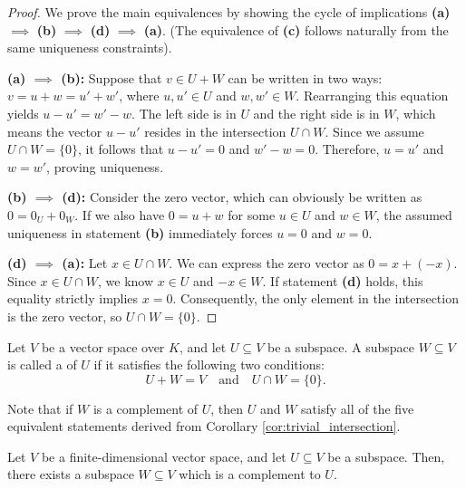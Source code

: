 \begin{proof}
We prove the main equivalences by showing the cycle of implications \textbf{(a)} $\implies$ \textbf{(b)} $\implies$ \textbf{(d)} $\implies$ \textbf{(a)}. (The equivalence of \textbf{(c)} follows naturally from the same uniqueness constraints).

\textbf{(a) $\implies$ (b):} Suppose that $v \in U + W$ can be written in two ways: $v = u + w = u' + w'$, where $u, u' \in U$ and $w, w' \in W$. Rearranging this equation yields $u - u' = w' - w$. The left side is in $U$ and the right side is in $W$, which means the vector $u - u'$ resides in the intersection $U \cap W$. Since we assume $U \cap W = \{0\}$, it follows that $u - u' = 0$ and $w' - w = 0$. Therefore, $u = u'$ and $w = w'$, proving uniqueness.

\textbf{(b) $\implies$ (d):} Consider the zero vector, which can obviously be written as $0 = 0_U + 0_W$. If we also have $0 = u + w$ for some $u \in U$ and $w \in W$, the assumed uniqueness in statement \textbf{(b)} immediately forces $u = 0$ and $w = 0$.

\textbf{(d) $\implies$ (a):} Let $x \in U \cap W$. We can express the zero vector as $0 = x + (-x)$. Since $x \in U \cap W$, we know $x \in U$ and $-x \in W$. If statement \textbf{(d)} holds, this equality strictly implies $x = 0$. Consequently, the only element in the intersection is the zero vector, so $U \cap W = \{0\}$.
\end{proof}

\setcounter{theorem}{3} %

\begin{definition}
\label{def:complement}
Let $V$ be a vector space over $K$, and let $U \subseteq V$ be a subspace. A subspace $W \subseteq V$ is called a  of $U$ if it satisfies the following two conditions:
\[
U + W = V \quad \text{and} \quad U \cap W = \{0\}.
\]
\end{definition}

\begin{remark}
Note that if $W$ is a complement of $U$, then $U$ and $W$ satisfy all of the five equivalent statements derived from Corollary \cref{cor:trivial_intersection}.
\end{remark}

\begin{proposition}
\label{prop:existence_complement}
Let $V$ be a finite-dimensional vector space, and let $U \subseteq V$ be a subspace. Then, there exists a subspace $W \subseteq V$ which is a complement to $U$.
\end{proposition}

